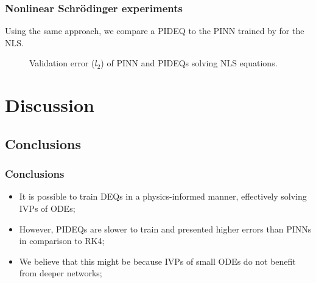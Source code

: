\documentclass[t]{beamer}
\begin{document}
\begin{frame}
    \frametitle{Nonlinear Schrödinger experiments}
    Using the same approach, we compare a PIDEQ to the PINN trained by \cite{Raissi2019} for the NLS.
    \pause
    \begin{figure}[h]
        \centering
        \caption{Validation error ($l_2$) of PINN and PIDEQs solving NLS equations.}
        \label{fig:nls-validation-ls-png}
    \end{figure}
\end{frame}

\section{Discussion}

\subsection{Conclusions}

\begin{frame}
    \frametitle{Conclusions}
    \begin{itemize}[label={\textbullet}]
        \item<1-> It is possible to train DEQs in a physics-informed manner, effectively solving IVPs of ODEs;
	\item<2-> However, PIDEQs are slower to train and presented higher errors than PINNs in comparison to RK4;
	\item<3-> We believe that this might be because IVPs of small ODEs do not benefit from deeper networks;
    \end{itemize}
\end{frame}
\end{document}
